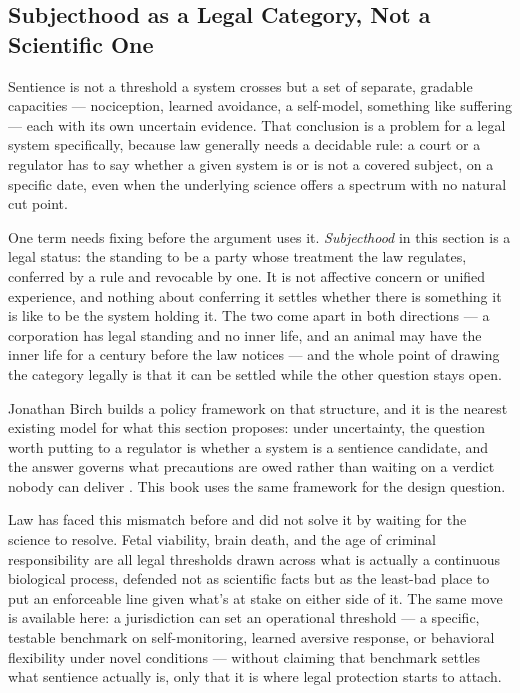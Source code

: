 \subsection{Subjecthood as a Legal Category, Not a Scientific One}
\label{sec:9.3.1}
Sentience is not a threshold a system crosses but a set of separate, gradable capacities — nociception, learned avoidance, a self-model, something like suffering — each with its own uncertain evidence. That conclusion is a problem for a legal system specifically, because law generally needs a decidable rule: a court or a regulator has to say whether a given system is or is not a covered subject, on a specific date, even when the underlying science offers a spectrum with no natural cut point.

One term needs fixing before the argument uses it. \emph{Subjecthood} in this section is a legal status: the standing to be a party whose treatment the law regulates, conferred by a rule and revocable by one. It is not affective concern or unified experience, and nothing about conferring it settles whether there is something it is like to be the system holding it. The two come apart in both directions — a corporation has legal standing and no inner life, and an animal may have the inner life for a century before the law notices — and the whole point of drawing the category legally is that it can be settled while the other question stays open.

Jonathan Birch builds a policy framework on that structure, and it is the nearest existing model for what this section proposes: under uncertainty, the question worth putting to a regulator is whether a system is a sentience candidate, and the answer governs what precautions are owed rather than waiting on a verdict nobody can deliver \autocite{birch2024edge}. This book uses the same framework for the design question.

Law has faced this mismatch before and did not solve it by waiting for the science to resolve. Fetal viability, brain death, and the age of criminal responsibility are all legal thresholds drawn across what is actually a continuous biological process, defended not as scientific facts but as the least-bad place to put an enforceable line given what's at stake on either side of it. The same move is available here: a jurisdiction can set an operational threshold — a specific, testable benchmark on self-monitoring, learned aversive response, or behavioral flexibility under novel conditions — without claiming that benchmark settles what sentience actually is, only that it is where legal protection starts to attach.

